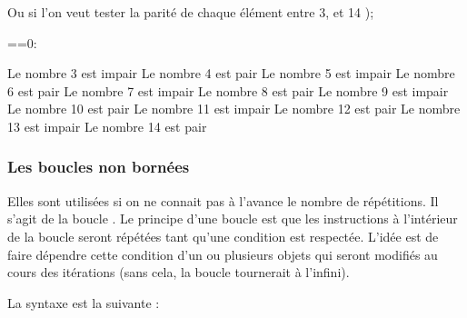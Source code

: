 \documentclass[letterpaper,10pt,french]{sphinxmanual}
\begin{document}
\sphinxAtStartPar
Ou si l’on veut tester la parité de chaque élément entre 3, et 14 );

\begin{sphinxVerbatim}[commandchars=\\\{\}]
    
     ==0:
          
           
\end{sphinxVerbatim}

\begin{sphinxVerbatim}[commandchars=\\\{\}]
Le nombre 3 est impair
Le nombre 4 est pair
Le nombre 5 est impair
Le nombre 6 est pair
Le nombre 7 est impair
Le nombre 8 est pair
Le nombre 9 est impair
Le nombre 10 est pair
Le nombre 11 est impair
Le nombre 12 est pair
Le nombre 13 est impair
Le nombre 14 est pair
\end{sphinxVerbatim}


\subsubsection{Les boucles non bornées}
\label{\detokenize{ch2:les-boucles-non-bornees}}
\sphinxAtStartPar
Elles sont utilisées si on ne connait pas à l’avance le nombre de répétitions. Il s’agit de la boucle .
Le principe d’une boucle  est que les instructions à l’intérieur de la boucle seront répétées tant qu’une condition est respectée. L’idée est de faire dépendre cette condition d’un ou plusieurs objets qui seront modifiés au cours des itérations (sans cela, la boucle tournerait à l’infini).

\sphinxAtStartPar
La syntaxe est la suivante :

\begin{sphinxVerbatim}[commandchars=\\\{\}]
 
\end{sphinxVerbatim}
\end{document}

